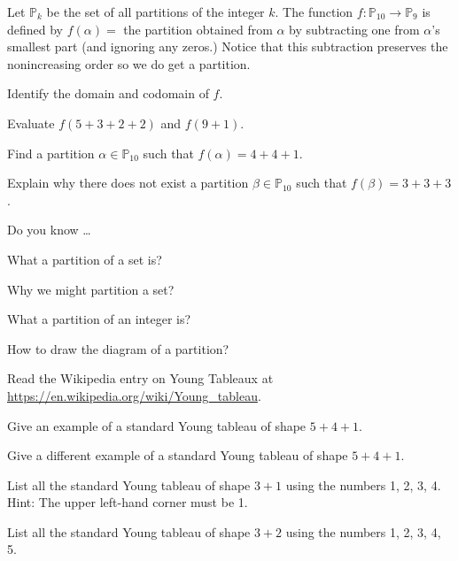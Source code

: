 \begin{exer}[\exerU] %
\label{exer_functions_on_partitions}
    Let $\mathbb{P}_{k}$ be the set of all partitions of the integer $k$. The function $f: \mathbb{P}_{10} \to \mathbb{P}_9$ is defined by $f(\alpha)=$ the partition obtained from $\alpha$ by subtracting one from $\alpha$'s smallest part (and ignoring any zeros.)  Notice that this subtraction preserves the nonincreasing order so we do get a partition. 
        \begin{apart}
            \item Identify the domain and codomain of $f$.
            \item  Evaluate $f(5+3+2+2)$ and $f(9+1)$.
            \item Find a partition $\alpha \in \mathbb{P}_{10}$ such that $f(\alpha) = 4 + 4 + 1$.
            \item Explain why there does not exist a partition $\beta \in \mathbb{P}_{10}$ such that $f(\beta) = 3+3+3$.  
        \end{apart}
\end{exer}

\begin{exer}[\exerR] %
\label{exer_dyk_defn_partition}
    Do you know \ldots
        \begin{exerpart}
            \item What a partition of a set is?
            \item Why we might partition a set?
            \item What a partition of an integer is?
            \item How to draw the diagram of a partition?
        \end{exerpart}
\end{exer}

\begin{exer}[\exerE] %
\label{exer_young_tableaux}
  Read the Wikipedia entry on Young Tableaux at \url{https://en.wikipedia.org/wiki/Young_tableau}.
      \begin{exerpart}
          \item Give an example of a standard Young tableau of shape $5+4+1$.  
          \item Give a different example of a standard Young tableau of shape $5+4+1$.
          \item List all the standard Young tableau of shape $3+1$ using the numbers 1, 2, 3, 4. Hint: The upper left-hand corner must be 1.
          \item List all the standard Young tableau of shape $3+2$ using the numbers 1, 2, 3, 4, 5.
      \end{exerpart}
\end{exer}


